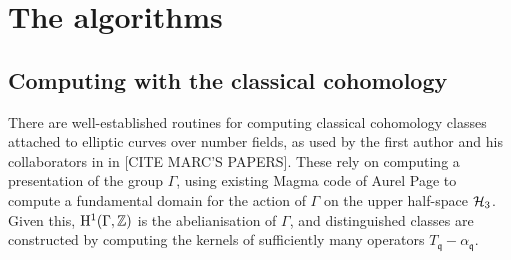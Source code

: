 \documentclass[a4paper,11pt]{article}
\numberwithin{equation}{section}
\begin{document}
\begin{comment}
We can now find an element $\gamma = \smallmatrd{\beta}{*}{pq}{*} \in \Gamma_0(N)$, and $\gamma\infty = \beta/pq$; thus $\Phi\{\beta/pq - \infty\} = \varphi(\gamma)$ and we can compute this directly, without inverting $\delta$. Similar formula hold for $N$ a product of primes, and also in the Bianchi setting, where now we consider moments attached to a pair of integers $(j,k)$.

\begin{remark}
Note that if $j \neq 0$ (or, in the Bianchi setting, when either $j \neq 0$ or $k \neq 0$) the scalar $1-a_q^{-d_q}q^{jd_q}$ is always non-zero, and thus we can always recover the \emph{higher} moments required to define the $p$-adic $L$-series without inverting $\delta$. However, when $j = 0$ (or $j=k=0$), it is possible for the scalar to vanish. In particular, if $f$ is attached to an elliptic curve $E$ of rank 1 with good reduction at $p$, then the sign of the functional equation forces the existence of some prime $q$ such that $a_q(E) = 1$, and then the scalar vanishes. This leads to the curious phenomenon where we can compute all but the first moment; and yet the first moment is precisely the value of the \emph{classical} modular symbol we started with. Thus via this method, in this case we can compute all of the overconvergent moments, but not the classical starting moment!
\end{remark}

\end{comment}

\section{The algorithms}

\subsection{Computing with the classical cohomology}
There are well-established routines for computing classical cohomology classes attached to elliptic curves over number fields, as used by the first author and his collaborators in in [CITE MARC'S PAPERS]. These rely on computing a presentation of the group $\Gamma$, using existing Magma code of Aurel Page to compute a fundamental domain for the action of $\Gamma$ on the upper half-space $\mathcal{H}_3$. Given this, $\mathrm{H}^1(\Gamma,\mathbb{Z})$ is the abelianisation of $\Gamma$, and distinguished classes are constructed by computing the kernels of sufficiently many operators $T_{\mathfrak{q}} - \alpha_{\mathfrak{q}}.$
\end{document}
